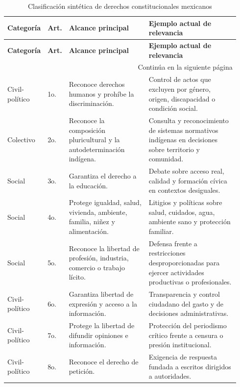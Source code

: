 \documentclass[
	spanish,
	letterpaper, oneside
]{article}
\begin{document}
\begin{landscape}
\thispagestyle{empty}
\begingroup
\scriptsize
\centering
\setlength{\tabcolsep}{3.2pt}
\renewcommand{\arraystretch}{1.12}
\begin{longtable}{@{}p{0.12\linewidth}p{0.07\linewidth}p{0.35\linewidth}p{0.40\linewidth}@{}}
\caption{Clasificación sintética de derechos constitucionales mexicanos}\label{tab:derechos-constitucionales}\\
\toprule
\textbf{Categoría} & \textbf{Art.} & \textbf{Alcance principal} & \textbf{Ejemplo actual de relevancia} \\
\midrule
\endfirsthead
\toprule
\textbf{Categoría} & \textbf{Art.} & \textbf{Alcance principal} & \textbf{Ejemplo actual de relevancia} \\
\midrule
\endhead
\midrule
\multicolumn{4}{r}{Continúa en la siguiente página} \\
\endfoot
\bottomrule
\endlastfoot
Civil-político & 1o. & Reconoce derechos humanos y prohíbe la discriminación. & Control de actos que excluyen por género, origen, discapacidad o condición social. \\
Colectivo & 2o. & Reconoce la composición pluricultural y la autodeterminación indígena. & Consulta y reconocimiento de sistemas normativos indígenas en decisiones sobre territorio y comunidad. \\
Social & 3o. & Garantiza el derecho a la educación. & Debate sobre acceso real, calidad y formación cívica en contextos desiguales. \\
Social & 4o. & Protege igualdad, salud, vivienda, ambiente, familia, niñez y alimentación. & Litigios y políticas sobre salud, cuidados, agua, ambiente sano y protección familiar. \\
Social & 5o. & Reconoce la libertad de profesión, industria, comercio o trabajo lícito. & Defensa frente a restricciones desproporcionadas para ejercer actividades productivas o profesionales. \\
Civil-político & 6o. & Garantiza libertad de expresión y acceso a la información. & Transparencia y control ciudadano del gasto y de decisiones administrativas. \\
Civil-político & 7o. & Protege la libertad de difundir opiniones e información. & Protección del periodismo crítico frente a censura o presión institucional. \\
Civil-político & 8o. & Reconoce el derecho de petición. & Exigencia de respuesta fundada a escritos dirigidos a autoridades. \\

\end{longtable}
\end{landscape}
\end{document}
